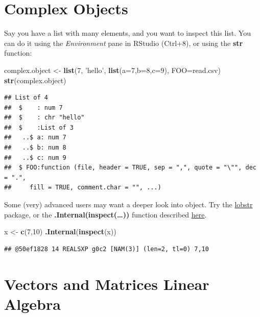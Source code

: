 \documentclass[]{book}
\newenvironment{Shaded}{\begin{snugshade}}{\end{snugshade}}
\newcommand{\KeywordTok}[1]{\textcolor[rgb]{0.13,0.29,0.53}{\textbf{#1}}}
\newcommand{\DataTypeTok}[1]{\textcolor[rgb]{0.13,0.29,0.53}{#1}}
\newcommand{\DecValTok}[1]{\textcolor[rgb]{0.00,0.00,0.81}{#1}}
\newcommand{\StringTok}[1]{\textcolor[rgb]{0.31,0.60,0.02}{#1}}
\newcommand{\NormalTok}[1]{#1}
\theoremstyle{definition}
\theoremstyle{definition}
\theoremstyle{definition}
\theoremstyle{remark}
\begin{document}
\section{Complex Objects}\label{complex-objects}

Say you have a list with many elements, and you want to inspect this
list. You can do it using the \emph{Environment} pane in RStudio
(Ctrl+8), or using the \textbf{str} function:

\begin{Shaded}
\begin{Highlighting}[]
\NormalTok{complex.object <-}\StringTok{ }\KeywordTok{list}\NormalTok{(}\DecValTok{7}\NormalTok{, }\StringTok{'hello'}\NormalTok{, }\KeywordTok{list}\NormalTok{(}\DataTypeTok{a=}\DecValTok{7}\NormalTok{,}\DataTypeTok{b=}\DecValTok{8}\NormalTok{,}\DataTypeTok{c=}\DecValTok{9}\NormalTok{), }\DataTypeTok{FOO=}\NormalTok{read.csv)}
\KeywordTok{str}\NormalTok{(complex.object)}
\end{Highlighting}
\end{Shaded}

\begin{verbatim}
## List of 4
##  $    : num 7
##  $    : chr "hello"
##  $    :List of 3
##   ..$ a: num 7
##   ..$ b: num 8
##   ..$ c: num 9
##  $ FOO:function (file, header = TRUE, sep = ",", quote = "\"", dec = ".", 
##     fill = TRUE, comment.char = "", ...)
\end{verbatim}

Some (very) advanced users may want a deeper look into object. Try the
\href{https://github.com/r-lib/lobstr/blob/master/README.md}{lobstr}
package, or the \textbf{.Internal(inspect(\ldots{}))} function described
\href{https://www.brodieg.com/2019/02/18/an-unofficial-reference-for-internal-inspect/}{here}.

\begin{Shaded}
\begin{Highlighting}[]
\NormalTok{x <-}\StringTok{ }\KeywordTok{c}\NormalTok{(}\DecValTok{7}\NormalTok{,}\DecValTok{10}\NormalTok{)}
\KeywordTok{.Internal}\NormalTok{(}\KeywordTok{inspect}\NormalTok{(x))}
\end{Highlighting}
\end{Shaded}

\begin{verbatim}
## @50ef1828 14 REALSXP g0c2 [NAM(3)] (len=2, tl=0) 7,10
\end{verbatim}

\section{Vectors and Matrices Linear
Algebra}\label{vectors-and-matrices-linear-algebra}
\end{document}

